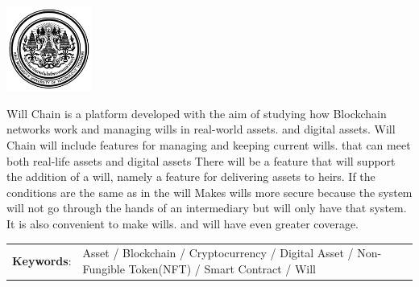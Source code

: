 \documentclass[12pt,oneside,openright,a4paper]{cpe-thai-project}
\begin{document}
\pdfstringdefDisableCommands{%
\let\MakeUppercase\relax
}

\begin{center}
  \includegraphics[width=2.8cm]{logo02.jpg}
\end{center}
\vspace*{-1cm}

\maketitlepage
\makesignaturepage 

\abstract

Will Chain is a platform developed with the aim of studying how Blockchain networks work and managing wills in real-world assets. and digital assets. Will Chain will include features for managing and keeping current wills. that can meet both real-life assets and digital assets There will be a feature that will support the addition of a will, namely a feature for delivering assets to heirs. If the conditions are the same as in the will Makes wills more secure because the system will not go through the hands of an intermediary but will only have that system. It is also convenient to make wills. and will have even greater coverage.

\begin{flushleft}
\begin{tabular*}{\textwidth}{@{}lp{}}
\textbf{Keywords}: & Asset / Blockchain / Cryptocurrency / Digital Asset / Non-Fungible Token(NFT) /  Smart Contract / Will 
\end{tabular*}
\end{flushleft}
\endabstract

\newcommand\tab[1][1cm]{\hspace*{#1}}
\thaiabstract
\end{document}
